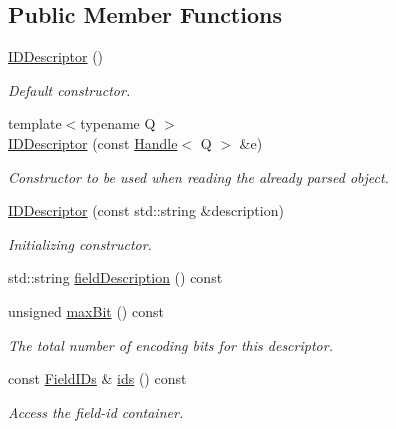 \subsection*{Public Member Functions}
\begin{DoxyCompactItemize}
\item 
\hyperlink{class_d_d4hep_1_1_geometry_1_1_i_d_descriptor_ae8a1de25ea540a8a4b0a51610883cdad}{IDDescriptor} ()
\begin{DoxyCompactList}\small\item\em Default constructor. \item\end{DoxyCompactList}\item 
{\footnotesize template$<$typename Q $>$ }\\\hyperlink{class_d_d4hep_1_1_geometry_1_1_i_d_descriptor_a74bad6296ac351ec41a75fe7e7c9eb7f}{IDDescriptor} (const \hyperlink{class_d_d4hep_1_1_handle}{Handle}$<$ Q $>$ \&e)
\begin{DoxyCompactList}\small\item\em Constructor to be used when reading the already parsed object. \item\end{DoxyCompactList}\item 
\hyperlink{class_d_d4hep_1_1_geometry_1_1_i_d_descriptor_ac4736ad94f2d1ccd1a2481cd1af3c833}{IDDescriptor} (const std::string \&description)
\begin{DoxyCompactList}\small\item\em Initializing constructor. \item\end{DoxyCompactList}\item 
std::string \hyperlink{class_d_d4hep_1_1_geometry_1_1_i_d_descriptor_af80368b77245c1d1b0aa2bb465621eb2}{fieldDescription} () const 
\item 
unsigned \hyperlink{class_d_d4hep_1_1_geometry_1_1_i_d_descriptor_a7a124ef5647a1c5f090c3a60cc4057d6}{maxBit} () const 
\begin{DoxyCompactList}\small\item\em The total number of encoding bits for this descriptor. \item\end{DoxyCompactList}\item 
const \hyperlink{class_d_d4hep_1_1_geometry_1_1_i_d_descriptor_a0ced4a2fe6dd5775becad359f39a9ee2}{FieldIDs} \& \hyperlink{class_d_d4hep_1_1_geometry_1_1_i_d_descriptor_a76229b96b002d0d33641ff79560f74c9}{ids} () const 
\begin{DoxyCompactList}\small\item\em Access the field-\/id container. \item\end{DoxyCompactList}\item 

\end{DoxyCompactItemize}
